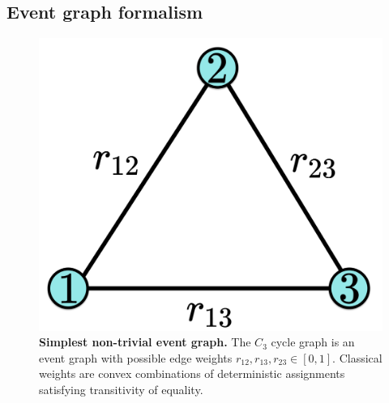 \documentclass[letterpaper,onecolumn,12pt,accepted=2024-01-17]{article}
\begin{document}
\subsection{Event graph formalism}\label{subsec: event graphs}
\begin{figure}[bt]
    \centering
    \includegraphics[width=0.2 \textwidth]{Acc_Figures/SimplestEventGraph.png}
    \caption{\textbf{Simplest non-trivial event graph.} The $C_3$ cycle graph is an event graph with possible edge weights $r_{12},r_{13},r_{23} \in [0,1]$. Classical weights are convex combinations of deterministic assignments satisfying transitivity of equality.}
    \label{fig: simplest event graph}
 \end{figure}
\end{document}
